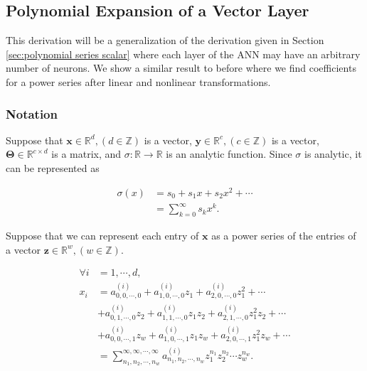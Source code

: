 \subsection{Polynomial Expansion of a Vector Layer}
\label{sec:polynomial series vector}

This derivation will be a generalization of the derivation given in Section \ref{sec:polynomial series scalar} where each layer of the ANN may have an arbitrary number of neurons. We show a similar result to before where we find coefficients for a power series after linear and nonlinear transformations.

\subsubsection{Notation}

Suppose that $\mathbf{x} \in \mathbb{R}^d, (d \in \mathbb{Z})$ is a vector, $\mathbf{y} \in \mathbb{R}^c, (c \in \mathbb{Z})$ is a vector, $\mathbf{\Theta} \in \mathbb{R}^{c \times d}$ is a matrix, and $\sigma: \mathbb{R} \to \mathbb{R}$ is an analytic function. Since $\sigma$ is analytic, it can be represented as

\begin{align}
    \sigma(x)
    &= s_0 + s_1 x + s_2 x^2 + \cdots \nonumber \\
    &= \sum_{k=0}^{\infty} s_{k} x^{k}.
    \label{eqn:vector layer activation}
\end{align}

Suppose that we can represent each entry of $\mathbf{x}$ as a power series of the entries of a vector $\mathbf{z} \in \mathbb{R}^{w}, (w \in \mathbb{Z})$.

\begin{align}
    \forall i &= 1, \cdots, d, \nonumber \\ x_i
    &= a^{(i)}_{0,0,\cdots,0} + a^{(i)}_{1,0,\cdots,0} z_1 + a^{(i)}_{2,0,\cdots,0} z_1^2 + \cdots \nonumber \\
    &+ a^{(i)}_{0,1,\cdots,0} z_2 + a^{(i)}_{1,1,\cdots,0} z_1 z_2 + a^{(i)}_{2,1,\cdots,0} z_1^2 z_2 + \cdots \nonumber \\
    &+ a^{(i)}_{0,0,\cdots,1} z_w + a^{(i)}_{1,0,\cdots,1} z_1 z_w + a^{(i)}_{2,0,\cdots,1} z_1^2 z_w + \cdots \nonumber \\
    &= \sum_{n_1,n_2,\cdots,n_w}^{\infty,\infty,\cdots,\infty} a^{(i)}_{n_1,n_2,\cdots,n_w} z_1^{n_1} z_2^{n_2} \cdots z_w^{n_w}.
    \label{eqn:vector x series}
\end{align}

